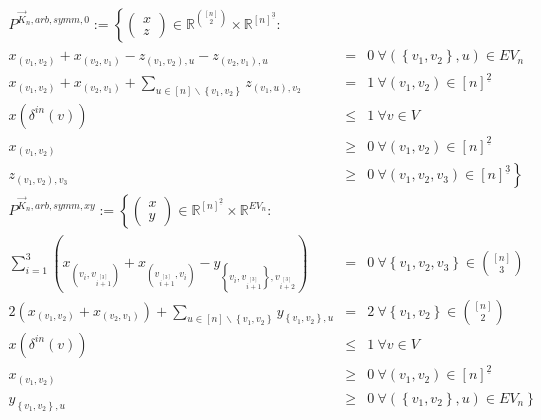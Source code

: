 \documentclass[10p,a4paper,BCOR = 12mm, DIV=15]{scrbook}
\begin{document}
{\begin{Kor}
\begin{eqnarray*}
P^{\vec{K}_n, arb, symm, 0} := \left\{\left(\begin{array}{c}
x \\
z
\end{array}\right)\in\mathbb{R}^{[n]\choose 2}\times \mathbb{R}^{[n]^{\underline{3}}}: \right. \nonumber \\
x_{\left(v_1, v_2\right)} + x_{\left(v_2, v_1\right)} - z_{\left(v_1, v_2\right), u} - z_{\left(v_2, v_1\right), u} & = & 0\ \forall \left(\left\{v_1, v_2\right\}, u\right)\in EV_n \\
x_{\left(v_1, v_2\right)} + x_{\left(v_2, v_1\right)} + \sum_{u\in[n]\backslash\left\{v_1, v_2\right\}} z_{\left(v_1, u\right), v_2} & = & 1\ \forall \left(v_1, v_2\right)\in [n]^{\underline{2}} \\
x\left(\delta^{in}\left(v\right)\right) & \leq & 1 \ \forall v \in V \\
x_{\left(v_1, v_2\right)} & \geq & 0 \ \forall \left(v_1, v_2\right) \in \left[n\right]^{\underline{2}} \nonumber \\
z_{\left(v_1, v_2\right), v_3} & \geq & 0\nonumber \left. \ \forall \left(v_1, v_2, v_3\right) \in \left[n\right]^{\underline{3}}\right\} \\
P^{\vec{K}_n, arb, symm, xy} := \left\{ \left(\begin{array}{c}
x \\
y
\end{array}\right)\in\mathbb{R}^{[n]^{\underline{2}}}\times \mathbb{R}^{EV_n}: \right.
\nonumber & & \\
\sum_{i=1}^3 \left(x_{\left(v_{i}, v_{i \stackrel{\left[3\right]}{+} 1}\right)} + x_{\left(v_{i \stackrel{\left[3\right]}{+} 1}, v_{i}\right)} -  y_{\left\{v_{i}, v_{i \stackrel{\left[3\right]}{+} 1}\right\}, v_{i \stackrel{\left[3\right]}{+} 2}}\right) & = & 0\ \forall \left\{v_1, v_2, v_3\right\}\in {[n] \choose 3} \\
2 \left(x_{\left(v_1, v_2\right)} + x_{\left(v_2, v_1\right)}\right) + \sum_{u\in[n]\backslash\left\{v_1, v_2\right\}} y_{\left\{v_1, v_2\right\}, u} & = & 2\ \forall \left\{v_1, v_2\right\}\in {[n] \choose 2} \\
x\left(\delta^{in}\left(v\right)\right) & \leq & 1 \ \forall v \in V \\
x_{\left(v_1, v_2\right)} & \geq & 0 \ \forall \left(v_1, v_2\right) \in \left[n\right]^{\underline{2}} \nonumber \\
y_{\left\{v_1, v_2\right\}, u} & \geq & 0\nonumber \left. \ \forall \left(\left\{v_1, v_2\right\}, u\right) \in EV_n \right\} \\

\end{eqnarray*}
\end{Kor}}
\end{document}
